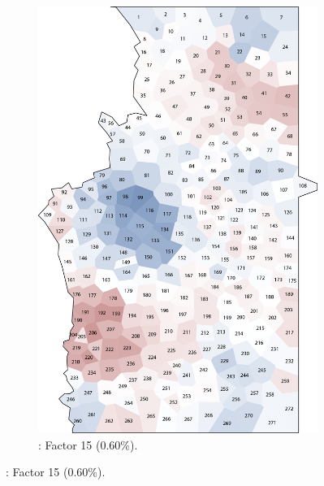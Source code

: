 \documentclass[output=paper]{LSP/langsci}
\begin{document}
\begin{figure}
\begin{subfigure}[t]{0.3\textwidth}
\includegraphics[width=\textwidth]{illustrations/pickl_fig17}
\caption{: Factor 15 (0.60\%).}
\label{fig:pickl:17}
\end{subfigure}
\end{figure}
\end{document}
